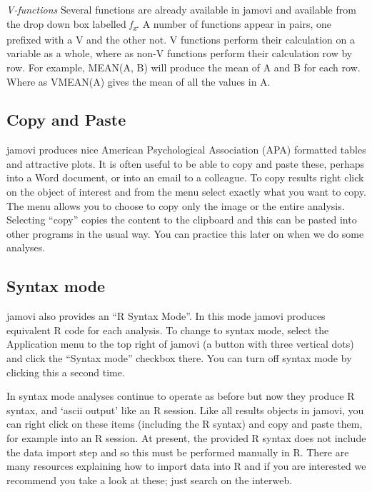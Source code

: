 \documentclass[
]{book}
\begin{document}
\emph{V-functions}
Several functions are already available in jamovi and available from the drop down box labelled \emph{f\textsubscript{x}}. A number of functions appear in pairs, one prefixed with a V and the other not. V functions perform their calculation on a variable as a whole, where as non-V functions perform their calculation row by row. For example, MEAN(A, B) will produce the mean of A and B for each row. Where as VMEAN(A) gives the mean of all the values in A.

\hypertarget{copypaste}{%
\subsection{Copy and Paste}\label{copypaste}}

jamovi produces nice American Psychological Association (APA) formatted tables and attractive plots. It is often useful to be able to copy and paste these, perhaps into a Word document, or into an email to a colleague. To copy results right click on the object of interest and from the menu select exactly what you want to copy. The menu allows you to choose to copy only the image or the entire analysis. Selecting ``copy'' copies the content to the clipboard and this can be pasted into other programs in the usual way. You can practice this later on when we do some analyses.

\hypertarget{syntaxmode}{%
\subsection{Syntax mode}\label{syntaxmode}}

jamovi also provides an ``R Syntax Mode''. In this mode jamovi produces equivalent R code for each analysis. To change to syntax mode, select the Application menu to the top right of jamovi (a button with three vertical dots) and click the ``Syntax mode'' checkbox there. You can turn off syntax mode by clicking this a second time.

In syntax mode analyses continue to operate as before but now they produce R syntax, and `ascii output' like an R session. Like all results objects in jamovi, you can right click on these items (including the R syntax) and copy and paste them, for example into an R session. At present, the provided R syntax does not include the data import step and so this must be performed manually in R. There are many resources explaining how to import data into R and if you are interested we recommend you take a look at these; just search on the interweb.
\end{document}
